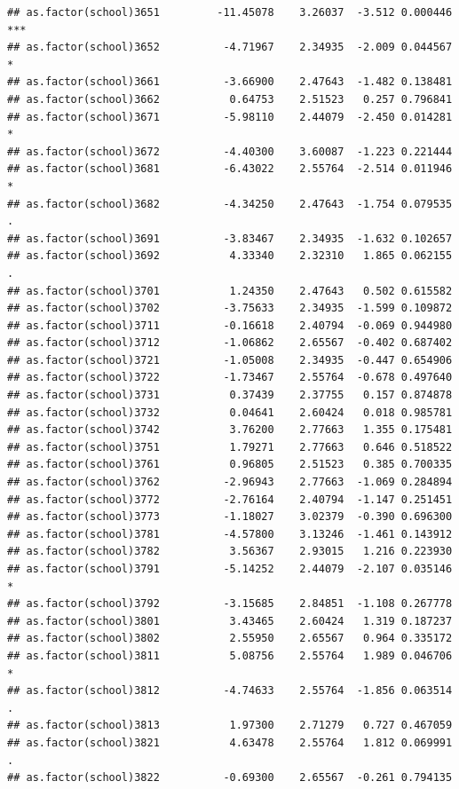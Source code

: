 \documentclass[ignorenonframetext,]{beamer}
\begin{document}
\begin{frame}[fragile]{}
\begin{verbatim}
## as.factor(school)3651         -11.45078    3.26037  -3.512 0.000446 ***
## as.factor(school)3652          -4.71967    2.34935  -2.009 0.044567 *  
## as.factor(school)3661          -3.66900    2.47643  -1.482 0.138481    
## as.factor(school)3662           0.64753    2.51523   0.257 0.796841    
## as.factor(school)3671          -5.98110    2.44079  -2.450 0.014281 *  
## as.factor(school)3672          -4.40300    3.60087  -1.223 0.221444    
## as.factor(school)3681          -6.43022    2.55764  -2.514 0.011946 *  
## as.factor(school)3682          -4.34250    2.47643  -1.754 0.079535 .  
## as.factor(school)3691          -3.83467    2.34935  -1.632 0.102657    
## as.factor(school)3692           4.33340    2.32310   1.865 0.062155 .  
## as.factor(school)3701           1.24350    2.47643   0.502 0.615582    
## as.factor(school)3702          -3.75633    2.34935  -1.599 0.109872    
## as.factor(school)3711          -0.16618    2.40794  -0.069 0.944980    
## as.factor(school)3712          -1.06862    2.65567  -0.402 0.687402    
## as.factor(school)3721          -1.05008    2.34935  -0.447 0.654906    
## as.factor(school)3722          -1.73467    2.55764  -0.678 0.497640    
## as.factor(school)3731           0.37439    2.37755   0.157 0.874878    
## as.factor(school)3732           0.04641    2.60424   0.018 0.985781    
## as.factor(school)3742           3.76200    2.77663   1.355 0.175481    
## as.factor(school)3751           1.79271    2.77663   0.646 0.518522    
## as.factor(school)3761           0.96805    2.51523   0.385 0.700335    
## as.factor(school)3762          -2.96943    2.77663  -1.069 0.284894    
## as.factor(school)3772          -2.76164    2.40794  -1.147 0.251451    
## as.factor(school)3773          -1.18027    3.02379  -0.390 0.696300    
## as.factor(school)3781          -4.57800    3.13246  -1.461 0.143912    
## as.factor(school)3782           3.56367    2.93015   1.216 0.223930    
## as.factor(school)3791          -5.14252    2.44079  -2.107 0.035146 *  
## as.factor(school)3792          -3.15685    2.84851  -1.108 0.267778    
## as.factor(school)3801           3.43465    2.60424   1.319 0.187237    
## as.factor(school)3802           2.55950    2.65567   0.964 0.335172    
## as.factor(school)3811           5.08756    2.55764   1.989 0.046706 *  
## as.factor(school)3812          -4.74633    2.55764  -1.856 0.063514 .  
## as.factor(school)3813           1.97300    2.71279   0.727 0.467059    
## as.factor(school)3821           4.63478    2.55764   1.812 0.069991 .  
## as.factor(school)3822          -0.69300    2.65567  -0.261 0.794135    

\end{verbatim}
\end{frame}
\end{document}
